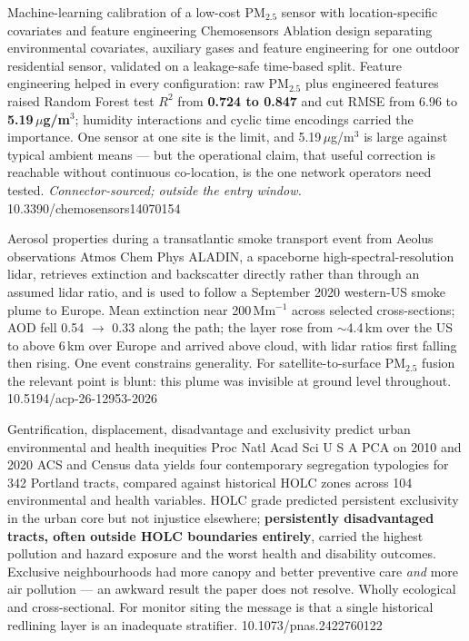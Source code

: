 \documentclass[10pt]{article}
\begin{document}
{Machine-learning calibration of a low-cost PM$_{2.5}$ sensor with location-specific
covariates and feature engineering}
{Chemosensors}
{Ablation design separating environmental covariates, auxiliary gases and feature
engineering for one outdoor residential sensor, validated on a leakage-safe time-based
split. Feature engineering helped in every configuration: raw PM$_{2.5}$ plus engineered
features raised Random Forest test $R^2$ from \textbf{0.724 to 0.847} and cut RMSE from
6.96 to \textbf{5.19\,$\mu$g/m$^3$}; humidity interactions and cyclic time encodings carried
the importance. One sensor at one site is the limit, and 5.19\,$\mu$g/m$^3$ is large
against typical ambient means --- but the operational claim, that useful correction is
reachable without continuous co-location, is the one network operators need tested.
\textit{Connector-sourced; outside the entry window.}}
{10.3390/chemosensors14070154}

{Aerosol properties during a transatlantic smoke transport event from Aeolus observations}
{Atmos Chem Phys}
{ALADIN, a spaceborne high-spectral-resolution lidar, retrieves extinction and backscatter
directly rather than through an assumed lidar ratio, and is used to follow a
September 2020 western-US smoke plume to Europe. Mean extinction near 200\,Mm$^{-1}$
across selected cross-sections; AOD fell 0.54 $\to$ 0.33 along the path; the layer rose
from $\sim$4.4\,km over the US to above 6\,km over Europe and arrived above cloud, with
lidar ratios first falling then rising. One event constrains generality. For
satellite-to-surface PM$_{2.5}$ fusion the relevant point is blunt: this plume was
invisible at ground level throughout.}
{10.5194/acp-26-12953-2026}


{Gentrification, displacement, disadvantage and exclusivity predict urban environmental
and health inequities}
{Proc Natl Acad Sci U S A}
{PCA on 2010 and 2020 ACS and Census data yields four contemporary segregation typologies
for 342 Portland tracts, compared against historical HOLC zones across 104 environmental
and health variables. HOLC grade predicted persistent exclusivity in the urban core but
not injustice elsewhere; \textbf{persistently disadvantaged tracts, often outside HOLC
boundaries entirely}, carried the highest pollution and hazard exposure and the worst
health and disability outcomes. Exclusive neighbourhoods had more canopy and better
preventive care \emph{and} more air pollution --- an awkward result the paper does not
resolve. Wholly ecological and cross-sectional. For monitor siting the message is that a
single historical redlining layer is an inadequate stratifier.}
{10.1073/pnas.2422760122}
\end{document}
